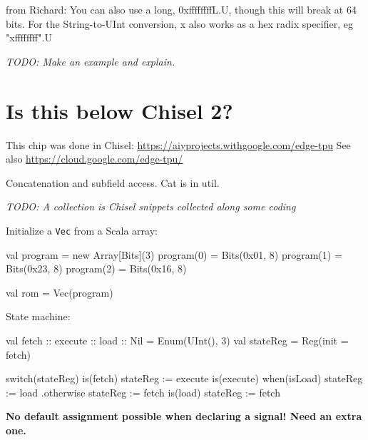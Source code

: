 \documentclass[%
    10pt, %
    headinclude, footexclude,
    openright, %
    notitlepage,
    cleardoubleempty,
    headsepline,
    pointlessnumbers,
    bibtotoc, idxtotoc,
    ]{scrbook}
\newcommand{\code}[1]{{\small{\texttt{#1}}}}
\newcommand{\todo}[1]{{\emph{TODO: #1}}}
\begin{document}
from Richard: 
You can also use a long, 0xffffffffL.U, though this will break at 64 bits.
For the String-to-UInt conversion, x also works as a hex radix specifier, eg "xffffffff".U

\todo{Make an example and explain.}



\section*{Is this below Chisel 2?}

This chip was done in Chisel: \url{https://aiyprojects.withgoogle.com/edge-tpu}
See also \url{https://cloud.google.com/edge-tpu/}

Concatenation and subfield access. Cat is in util. 

\todo{A collection is Chisel snippets collected along some coding}

Initialize a \code{Vec} from a Scala array:
\begin{chisel}
  val program = new Array[Bits](3)
  program(0) = Bits(0x01, 8)
  program(1) = Bits(0x23, 8)
  program(2) = Bits(0x16, 8)
    
  val rom = Vec(program)
\end{chisel}

State machine:
\begin{chisel}
  val fetch :: execute :: load :: Nil = Enum(UInt(), 3)
  val stateReg = Reg(init = fetch)

  switch(stateReg) {
    is(fetch) {
      stateReg := execute
    }
    is(execute) {
      when(isLoad) {
        stateReg := load
      }.otherwise {
        stateReg := fetch
      }
    }
    is(load) {
      stateReg := fetch
    }
  }
\end{chisel}

\textbf{No default assignment possible when declaring a signal! Need an extra one.}
\end{document}
